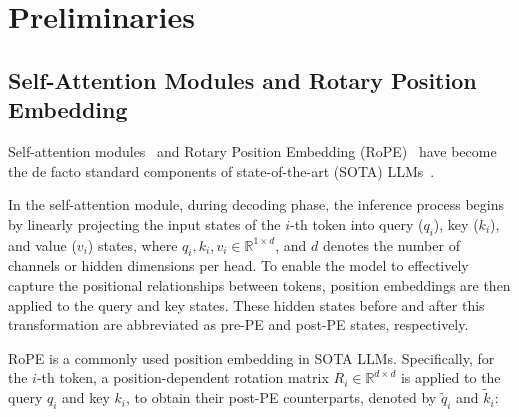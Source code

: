 \section{Preliminaries}




\subsection{Self-Attention Modules and Rotary Position Embedding}

\label{sec:rope}

Self-attention modules~\citep{transformer} and Rotary Position Embedding (RoPE)~\citep{rope} have become the de facto standard components of state-of-the-art (SOTA) LLMs~\citep{llama-3, qwen-2.5, mixtral, deepseek-v3}.

In the self-attention module, during decoding phase, the inference process begins by linearly projecting the input states of the \(i\)-th token into query (\(q_i\)), key (\(k_i\)), and value (\(v_i\)) states,  where \(q_i, k_i, v_i \in \mathbb{R}^{1 \times d}\), and \(d\) denotes the number of channels or hidden dimensions per head. 
To enable the model to effectively capture the positional relationships between tokens, position embeddings are then applied to the query and key states. 
These hidden states before and after this transformation are abbreviated as pre-PE and post-PE states, respectively.

RoPE is a commonly used position embedding in SOTA LLMs.
Specifically, for the \(i\)-th token, a position-dependent rotation matrix \(R_i \in \mathbb{R}^{d \times d}\) is applied to the query \(q_i\) and key \(k_i\), to obtain their post-PE counterparts, denoted by \(\tilde q_i\) and \(\tilde k_i\):


